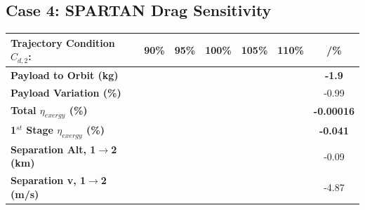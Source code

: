 \subsection{Case 4: SPARTAN Drag Sensitivity}\label{sec:dragvariation}

\begin{table}[ht!]
	\centering
	\begin{tabular}{l c c c c c c} 
		\hline \textbf{Trajectory Condition}   \qquad  $C_{d,2}$: 
		&90\%
		&95\%
		&100\%
		&105\%
		&110\%
		& /\%
		\\
		\hline \textbf{Payload to Orbit (kg)}
		& \textbf{\PayloadToOrbitCdNinetyNoReturn}
		& \textbf{\PayloadToOrbitCdNinetyFiveNoReturn}
		& \textbf{\PayloadToOrbitCdStandardNoReturn}
		& \textbf{\PayloadToOrbitCdOneHundredFiveNoReturn}
		& \textbf{\PayloadToOrbitCdOneHundredTenNoReturn}
		&\textbf{-1.9}
		\\
		\textbf{Payload Variation (\%)}
		& \PayloadVarCdNinetyNoReturn
		& \PayloadVarCdNinetyFiveNoReturn
		& \PayloadVarCdStandardNoReturn
		& \PayloadVarCdOneHundredFiveNoReturn
		& \PayloadVarCdOneHundredTenNoReturn
		&-0.99
		\\
		\textbf{Total $\eta_{exergy}$ (\%)}
		& \textbf{\totalExergyEffCdNinetyNoReturn}
		& \textbf{\totalExergyEffCdNinetyFiveNoReturn}
		& \textbf{\totalExergyEffCdStandardNoReturn}
		& \textbf{\totalExergyEffCdOneHundredFiveNoReturn}
		& \textbf{\totalExergyEffCdOneHundredTenNoReturn}
		& \textbf{-0.00016}
		\\
		\hline 
		\textbf{1$^{st}$ Stage $\eta_{exergy}$ (\%)}
		& \textbf{\firstExergyEffCdNinetyNoReturn}
		& \textbf{\firstExergyEffCdNinetyFiveNoReturn}
		& \textbf{\firstExergyEffCdStandardNoReturn}
		& \textbf{\firstExergyEffCdOneHundredFiveNoReturn}
		& \textbf{\firstExergyEffCdOneHundredTenNoReturn}
		& \textbf{-0.041}
		\\
		\textbf{Separation Alt, 1$\rightarrow$2 (km)}
		& \firstsecondSeparationAltCdNinetyNoReturn
		& \firstsecondSeparationAltCdNinetyFiveNoReturn
		& \firstsecondSeparationAltCdStandardNoReturn
		& \firstsecondSeparationAltCdOneHundredFiveNoReturn
		& \firstsecondSeparationAltCdOneHundredTenNoReturn
		&-0.09
		\\
		\textbf{Separation v, 1$\rightarrow$2 (m/s)}
		& \firstsecondSeparationvCdNinetyNoReturn
		& \firstsecondSeparationvCdNinetyFiveNoReturn
		& \firstsecondSeparationvCdStandardNoReturn
		& \firstsecondSeparationvCdOneHundredFiveNoReturn
		& \firstsecondSeparationvCdOneHundredTenNoReturn
		&-4.87
		\\

\end{tabular}
\end{table}
